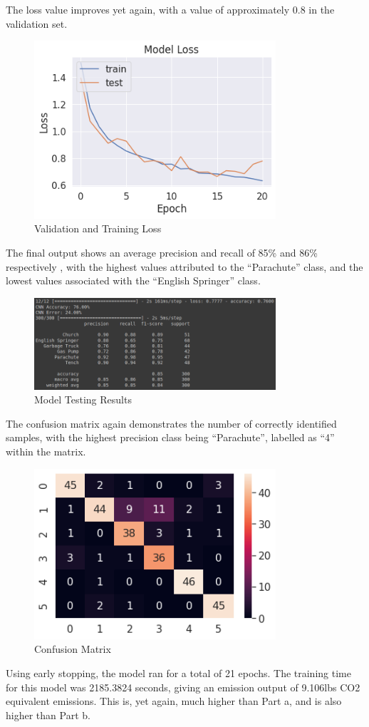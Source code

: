 The loss value improves yet again, with a value of approximately 0.8 in the
validation set.

\begin{figure}[H]
	\centering
	\includegraphics[width=0.8\textwidth]{images/q1/pc/loss}
	\caption{Validation and Training Loss}
	\label{fig:q1pcloss}
\end{figure}

The final output shows an average precision and recall of 85\% and 86\%
respectively , with the highest
values attributed to the ``Parachute'' class, and the lowest values associated
with the ``English Springer'' class.

\begin{figure}[H]
	\centering
	\includegraphics[width=0.8\textwidth]{images/q1/pc/results}
	\caption{Model Testing Results}
	\label{fig:q1pcRes}
\end{figure}

The confusion matrix again demonstrates the number of correctly identified
samples, with the highest precision class being ``Parachute'', labelled as
``4'' within the matrix.

\begin{figure}[H]
	\centering
	\includegraphics[width=0.8\textwidth]{images/q1/pc/matrix}
	\caption{Confusion Matrix}
	\label{fig:q1pcMatrix}
\end{figure}

Using early stopping, the model ran for a total of 21 epochs. The training time
for this model was 2185.3824 seconds, giving an emission output of 9.106lbs CO2
equivalent emissions. This is, yet again, much higher than Part a, and is also
higher than Part b.
